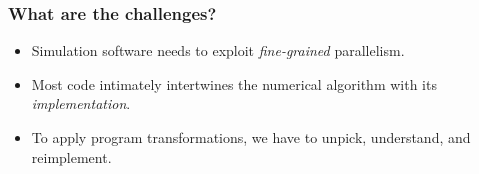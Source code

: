 \documentclass[presentation]{beamer}
\begin{document}


\begin{frame}
  \frametitle{What are the challenges?}
  \begin{itemize}
  \item Simulation software needs to exploit \emph{fine-grained}
    parallelism.
  \item Most code intimately intertwines the numerical algorithm with
    its \emph{implementation}.
  \item To apply program transformations, we have to unpick,
    understand, and reimplement.
  \end{itemize}
\end{frame}
\end{document}
